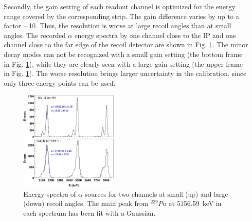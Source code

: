 \documentclass[number,5p]{elsarticle}
\begin{document}
Secondly, the gain setting of each readout channel is optimized for the energy range covered by the corresponding strip.
The gain difference varies by up to a factor $\mathtt{\sim}$10.
Thus, the resolution is worse at large recoil angles than at small angles.
The recorded $\alpha$ energy spectra by one channel close to the IP and one
channel close to the far edge of the recoil detector are shown in Fig. \ref{fig:alpha_spectrum}.
The minor decay modes can not be recognized with a small gain setting (the bottom frame
in Fig. \ref{fig:alpha_spectrum}), while they are clearly seen with a large gain
setting (the upper frame in Fig. \ref{fig:alpha_spectrum}).
The worse resolution brings larger uncertainty in the calibration, since only three energy points can be used.
\begin{figure}[bht!]
  \centering
  \includegraphics[width=0.45\textwidth]{./alpha_comparison_corrected_fit_separate.png}
  \caption{Energy spectra of \(\alpha\) sources for two channels at small (up)
    and large (down) recoil angles. The main peak from $^{239}Pu$ at
    \SI{5156.59}{\keV} in each spectrum has been fit with a Gaussian.}
  \label{fig:alpha_spectrum}
\end{figure}
\end{document}

